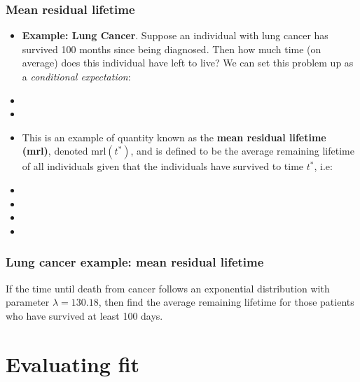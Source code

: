 \begin{frame}
\frametitle{Mean residual lifetime}
\begin{itemize}
\item \textbf{Example: Lung Cancer}. Suppose an individual with lung cancer has survived 100 months since being diagnosed.  Then how much time (on average) does this individual have left to live? We can set this problem up as a \textit{conditional expectation}:
\item[]
\item[]

\item This is an example of quantity known as the \textbf{mean residual lifetime (mrl)}, denoted $\mbox{mrl}(t^*)$, and is
defined to be the average remaining lifetime of all individuals given that the
individuals have survived to time $t^*$, i.e:
\item[]
\item[]
\item[]
\item[]


\end{itemize}
\end{frame}

\begin{frame}
\frametitle{Lung cancer example: mean residual lifetime}
If the time until death from cancer follows an exponential distribution with parameter $\lambda=130.18$, then find the average remaining lifetime for those patients who have survived at least 100 days.
\vskip150pt
\end{frame}

\section[Evaluating fit]{Evaluating fit}
\subsection{}
\begin{frame}
\end{frame}

